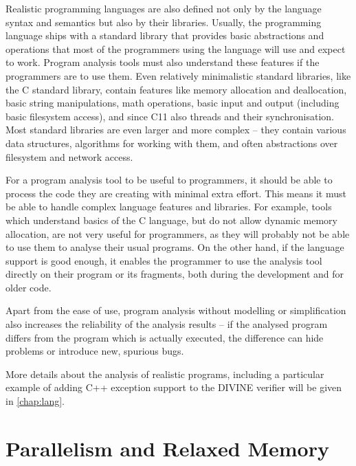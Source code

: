 Realistic programming languages are also defined not only by the language syntax and semantics but also by their libraries.
Usually, the programming language ships with a standard library that provides basic abstractions and operations that most of the programmers using the language will use and expect to work.
Program analysis tools must also understand these features if the programmers are to use them.
Even relatively minimalistic standard libraries, like the C standard library, contain features like memory allocation and deallocation, basic string manipulations, math operations, basic input and output (including basic filesystem access), and since C11 also threads and their synchronisation.
Most standard libraries are even larger and more complex -- they contain various data structures, algorithms for working with them, and often abstractions over filesystem and network access.

For a program analysis tool to be useful to programmers, it should be able to process the code they are creating with minimal extra effort.
This means it must be able to handle complex language features and libraries.
For example, tools which understand basics of the C language, but do not allow dynamic memory allocation, are not very useful for programmers, as they will probably not be able to use them to analyse their usual programs.
On the other hand, if the language support is good enough, it enables the programmer to use the analysis tool directly on their program or its fragments, both during the development and for older code.

Apart from the ease of use, program analysis without modelling or simplification also increases the reliability of the analysis results --
if the analysed program differs from the program which is actually executed, the difference can hide problems or introduce new, spurious bugs.

More details about the analysis of realistic programs, including a particular
example of adding C++ exception support to the DIVINE verifier will be given in
\autoref{chap:lang}.

\section{Parallelism and Relaxed Memory}

